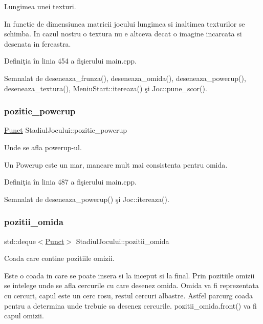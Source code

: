 Lungimea unei texturi. 

In functie de dimensiunea matricii jocului lungimea si inaltimea texturilor se schimba. In cazul nostru o textura nu e altceva decat o imagine incarcata si desenata in fereastra. 

Definiţia în linia 454 a fişierului main.\+cpp.



Semnalat de deseneaza\+\_\+frunza(), deseneaza\+\_\+omida(), deseneaza\+\_\+powerup(), deseneaza\+\_\+textura(), Meniu\+Start\+::itereaza() şi Joc\+::pune\+\_\+scor().

\mbox{\label{classStadiulJocului_a9e472dcc33fa67d1b5e000576133c3ac}} 
\subsubsection{\texorpdfstring{pozitie\+\_\+powerup}{pozitie\_powerup}}
{\footnotesize\ttfamily \hyperlink{structPunct}{Punct} Stadiul\+Jocului\+::pozitie\+\_\+powerup}



Unde se afla powerup-\/ul. 

Un Powerup este un mar, mancare mult mai consistenta pentru omida. 

Definiţia în linia 487 a fişierului main.\+cpp.



Semnalat de deseneaza\+\_\+powerup() şi Joc\+::itereaza().

\mbox{\label{classStadiulJocului_a64e0608d9c68b22ea83fd5aba209453f}} 
\subsubsection{\texorpdfstring{pozitii\+\_\+omida}{pozitii\_omida}}
{\footnotesize\ttfamily std\+::deque$<$\hyperlink{structPunct}{Punct}$>$ Stadiul\+Jocului\+::pozitii\+\_\+omida}



Coada care contine pozitiile omizii. 

Este o coada in care se poate insera si la inceput si la final. Prin pozitiile omizii se intelege unde se afla cercurile cu care desenez omida. Omida va fi reprezentata cu cercuri, capul este un cerc rosu, restul cercuri albastre. Astfel parcurg coada pentru a determina unde trebuie sa desenez cercurile. pozitii\+\_\+omida.\+front() va fi capul omizii. 

